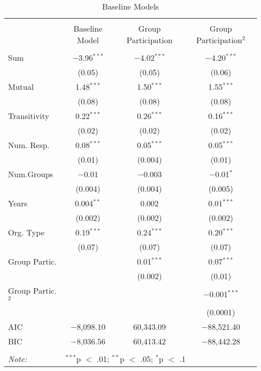 
\begin{table}[!htbp] \centering 
  \caption{Baseline Models} 
  \label{table:basemods} 
\begin{tabular}{@{\extracolsep{5pt}}lccc} 
\\[-1.8ex]\hline \\[-1.8ex] 
 & Baseline Model & Group Participation & Group Participation$^2$ \\ 
\hline \\[-1.8ex] 
 Sum & $-$3.96$^{***}$ & $-$4.02$^{***}$ & $-$4.20$^{***}$ \\ 
  & (0.05) & (0.05) & (0.06) \\ 
  Mutual & 1.48$^{***}$ & 1.50$^{***}$ & 1.55$^{***}$ \\ 
  & (0.08) & (0.08) & (0.08) \\ 
  Transitivity & 0.22$^{***}$ & 0.26$^{***}$ & 0.16$^{***}$ \\ 
  & (0.02) & (0.02) & (0.02) \\ 
  Num. Resp. & 0.08$^{***}$ & 0.05$^{***}$ & 0.05$^{***}$ \\ 
  & (0.01) & (0.004) & (0.01) \\ 
  Num.Groups & $-$0.01 & $-$0.003 & $-$0.01$^{*}$ \\ 
  & (0.004) & (0.004) & (0.005) \\ 
  Years & 0.004$^{**}$ & 0.002 & 0.01$^{***}$ \\ 
  & (0.002) & (0.002) & (0.002) \\ 
  Org. Type & 0.19$^{***}$ & 0.24$^{***}$ & 0.20$^{***}$ \\ 
  & (0.07) & (0.07) & (0.07) \\ 
  Group Partic. &  & 0.01$^{***}$ & 0.07$^{***}$ \\ 
  &  & (0.002) & (0.01) \\ 
  Group Partic.$^2$ &  &  & $-$0.001$^{***}$ \\ 
  &  &  & (0.0001) \\ 
 AIC & $-$8,098.10 & 60,343.09 & $-$88,521.40 \\ 
BIC & $-$8,036.56 & 60,413.42 & $-$88,442.28 \\ 
\hline \\[-1.8ex] 
\textit{Note:} & \multicolumn{3}{l}{$^{***}$p $<$ .01; $^{**}$p $<$ .05; $^{*}$p $<$ .1} \\ 
\end{tabular} 
\end{table} 
